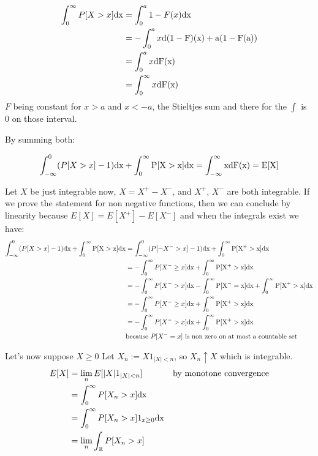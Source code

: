 \documentclass[12pt]{article}
\begin{document}
\begin{enumerate}
\begin{align*}
\int^{\infty}_0 P[X > x] \rm dx 
&= \int_0^a 1 - F(x) \rm dx \\
&= -\int_0^a x \rm d(1- F) (x) + a(1-F(a)) \\
&= \int_0^a x \rm d F(x) \\
&= \int_0^{\infty} x \rm d F(x) \\
\end{align*}
$F$ being constant for $x > a$ and $x < -a$, the Stieltjes sum and there for the $\int$ is 0 on those interval.



By summing both:

$$\int_{-\infty}^0 (P[X > x] - 1) \rm dx + \int^{\infty}_0 P[X > x]  \rm dx = \int_{-\infty}^{\infty} x \rm d F(x) = E[X]$$

Let $X$ be just integrable now, $X = X^+ - X^-$, and $X^+$, $X^-$ are both integrable.
If we prove the statement for non negative functions, then we can conclude by linearity because
$E[X] = E[X^+] - E[X^-]$ and when the integrals exist we have:
\begin{align*}
\int_{-\infty}^0 (P[X > x] - 1) \rm dx + \int^{\infty}_0 P[X > x]  \rm dx &= \int_{-\infty}^0 (P[-X^- > x] - 1) \rm dx + \int^{\infty}_0 P[X^+ > x]  \rm dx 
\\&=
-\int_0^{\infty} P[X^- \geq x]  \rm dx + \int^{\infty}_0 P[X^+ > x]  \rm dx 
\\&=-\int_0^{\infty} P[X^- > x]  \rm dx  - \int_0^{\infty} P[X^- = x]  \rm dx + \int^{\infty}_0 P[X^+ > x]  \rm dx
\\&=
-\int_0^{\infty} P[X^- \geq x]  \rm dx + \int^{\infty}_0 P[X^+ > x]  \rm dx 
\\&=-\int_0^{\infty} P[X^- > x]  \rm dx + \int^{\infty}_0 P[X^+ > x]  \rm dx \\&\text{because $P[X^- = x]$ is non zero on at most a countable set}
\end{align*}


Let's now suppose $X \geq 0$
Let $X_n := X1_{|X|<n}$, so $X_n \uparrow X$ which is integrable.
\begin{align*}
E[X] &= \lim_n E[|X|1_{|X|<n}] &\text{by monotone convergence}\\
&=\int^{\infty}_0 P[X_n > x]  \rm dx \\
&= \int^{\infty}_0 P[X_n > x]1_{x \geq 0}  \rm dx \\
&= \lim_n \int_{\mathbb{R}} P[X_n > x]
\end{align*}



\end{enumerate}
\end{document}
